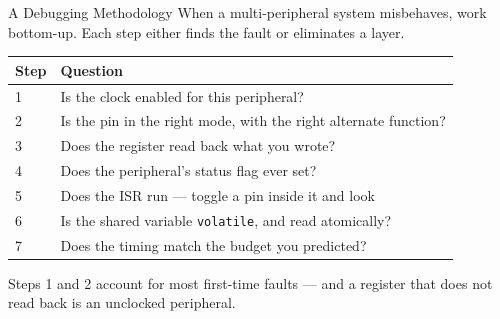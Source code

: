 \documentclass[9pt,aspectratio=169,xcolor=table]{beamer}
\newcommand{\striped}{\rowcolors{1}{white}{stripe}}
\begin{document}
\begin{frame}{A Debugging Methodology}
    \leavevmode
    When a multi-peripheral system misbehaves, work \alert{bottom-up}. Each step
    either finds the fault or eliminates a layer.

    \vspace{1mm}
    \begin{center}
    {\small
    \striped
    \begin{tabular}{@{}l R{.60\textwidth}@{}}
        \toprule
        \textbf{Step} & \textbf{Question} \\
         & Is the \alert{clock} enabled for this peripheral? \\
        2 & Is the \alert{pin} in the right mode, with the right alternate function? \\
        3 & Does the \alert{register} read back what you wrote? \\
        4 & Does the peripheral's \alert{status flag} ever set? \\
        5 & Does the \alert{ISR} run --- toggle a pin inside it and look \\
        6 & Is the \alert{shared variable} \texttt{volatile}, and read atomically? \\
        7 & Does the \alert{timing} match the budget you predicted? \\
        \bottomrule
    \end{tabular}}
    \end{center}

    \vspace{1mm}
    {\small Steps 1 and 2 account for most first-time faults --- and
    \alert{a register that does not read back is an unclocked peripheral}.}
\end{frame}
\end{document}
